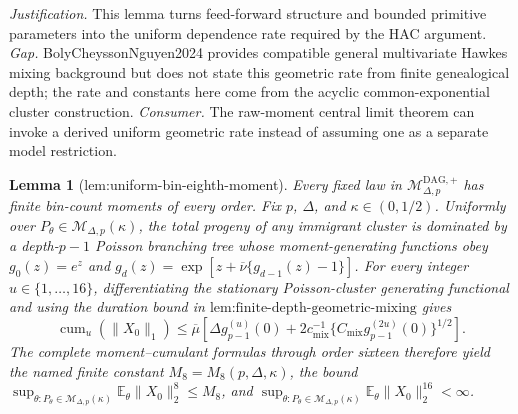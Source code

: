\documentclass{article}
\newtheorem{lemma}{Lemma}
\begin{document}
\par\smallskip\noindent \textit{Justification.} This lemma turns feed-forward structure and bounded primitive parameters into the uniform dependence rate required by the HAC argument. \textit{Gap.} BolyCheyssonNguyen2024 provides compatible general multivariate Hawkes mixing background but does not state this geometric rate from finite genealogical depth; the rate and constants here come from the acyclic common-exponential cluster construction. \textit{Consumer.} The raw-moment central limit theorem can invoke a derived uniform geometric rate instead of assuming one as a separate model restriction.

\begin{lemma}[lem:uniform-bin-eighth-moment]\label{lem:uniform-bin-eighth-moment}
Every fixed law in \(\mathcal M_{\Delta,p}^{\mathrm{DAG},+}\) has finite bin-count moments of every order. Fix \(p\), \(\Delta\), and \(\kappa\in(0,1/2)\). Uniformly over \(P_{\theta}\in\mathcal M_{\Delta,p}(\kappa)\), the total progeny of any immigrant cluster is dominated by a depth-\(p-1\) Poisson branching tree whose moment-generating functions obey \(g_0(z)=e^z\) and \(g_d(z)=\exp[z+\overline\nu\{g_{d-1}(z)-1\}]\). For every integer \(u\in\{1,\ldots,16\}\), differentiating the stationary Poisson-cluster generating functional and using the duration bound in \(\text{lem:finite-depth-geometric-mixing}\) gives \[\operatorname{cum}_u(\lVert X_0\rVert_1)\leq\overline\mu\left[\Delta g_{p-1}^{(u)}(0)+2c_{\mathrm{mix}}^{-1}\{C_{\mathrm{mix}}g_{p-1}^{(2u)}(0)\}^{1/2}\right].\] The complete moment--cumulant formulas through order sixteen therefore yield the named finite constant \(M_8=M_8(p,\Delta,\kappa)\), the bound \(\sup_{\theta:P_{\theta}\in\mathcal M_{\Delta,p}(\kappa)}\mathbb E_{\theta}\lVert X_0\rVert_2^8\leq M_8\), and \(\sup_{\theta:P_{\theta}\in\mathcal M_{\Delta,p}(\kappa)}\mathbb E_{\theta}\lVert X_0\rVert_2^{16}<\infty\).
\end{lemma}
\end{document}
